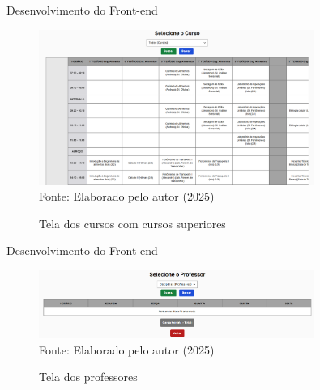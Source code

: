 \begin{frame}{Desenvolvimento do Front-end}
    \begin{figure}
        \centering
        \vspace{-0.5cm}
        \caption{Tela dos cursos com cursos superiores}
        \vspace{-0.2cm}
        \includegraphics[width=0.8\textwidth]{figuras/front-4.png}
        \\ %
        \small Fonte: Elaborado pelo autor (2025)
    \end{figure}
\end{frame}

\begin{frame}{Desenvolvimento do Front-end}
    \begin{figure}
        \centering
        \vspace{-0.5cm}
        \caption{Tela dos professores}
        \vspace{-0.2cm}
        \includegraphics[width=0.8\textwidth]{figuras/front-5.png}
        \\ %
        \small Fonte: Elaborado pelo autor (2025)
    \end{figure}
\end{frame}

